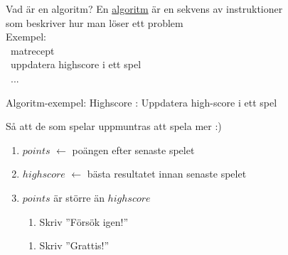 \documentclass{lecturenotes}
\begin{document}
\begin{Slide}{Vad är en algoritm?}
En \href{https://sv.wikipedia.org/wiki/Algoritm}{algoritm} är en sekvens av instruktioner\\ som beskriver hur man löser ett problem \\
\vspace{2em}
Exempel: \\ ~matrecept \\ \pause ~uppdatera highscore i ett spel \\ ~...
\end{Slide}

\begin{Slide}{Algoritm-exempel: Highscore}
: Uppdatera high-score i ett spel \\ \vspace{1em}

 \pause Så att de som spelar uppmuntras att spela mer :) \\ \vspace{1em}

\pause
\begin{enumerate}
\item $points$ $\leftarrow$ poängen efter senaste spelet
\item $highscore$ $\leftarrow$ bästa resultatet innan senaste spelet
\item {} $points$ är större än $highscore$ 
\begin{enumerate}[ ~~]
\item  Skriv ''Försök igen!''
\end{enumerate}
\begin{enumerate}[ ~~]
\item  Skriv ''Grattis!''
\end{enumerate}
\end{enumerate}
\pause
\scriptsize {}
\end{Slide}
\end{document}
